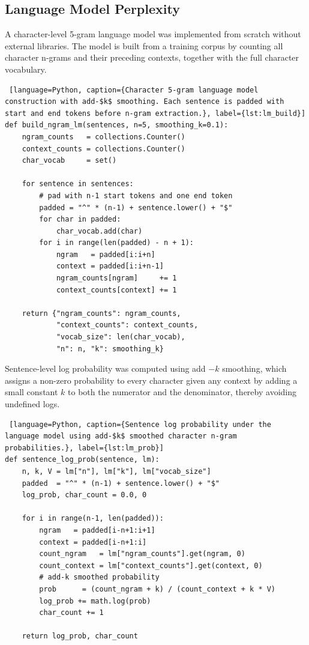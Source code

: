 \documentclass[12pt]{ThesisRU}
\begin{document}
\subsection{Language Model Perplexity}

A character-level 5-gram language model was implemented from scratch without external libraries. The model is built from a training corpus by counting all character n-grams and their preceding contexts, together with the full character vocabulary.

\begin{lstlisting} [language=Python, caption={Character 5-gram language model construction with add-$k$ smoothing. Each sentence is padded with start and end tokens before n-gram extraction.}, label={lst:lm_build}]
def build_ngram_lm(sentences, n=5, smoothing_k=0.1):
    ngram_counts   = collections.Counter()
    context_counts = collections.Counter()
    char_vocab     = set()
 
    for sentence in sentences:
        # pad with n-1 start tokens and one end token
        padded = "^" * (n-1) + sentence.lower() + "$"
        for char in padded:
            char_vocab.add(char)
        for i in range(len(padded) - n + 1):
            ngram   = padded[i:i+n]
            context = padded[i:i+n-1]
            ngram_counts[ngram]     += 1
            context_counts[context] += 1
 
    return {"ngram_counts": ngram_counts,
            "context_counts": context_counts,
            "vocab_size": len(char_vocab),
            "n": n, "k": smoothing_k}
\end{lstlisting}

Sentence-level log probability was computed using add $-k$ smoothing, which assigns a non-zero probability to every character given any context by adding a small constant $k$ to both the numerator and the denominator, thereby avoiding undefined logs.

\begin{lstlisting} [language=Python, caption={Sentence log probability under the language model using add-$k$ smoothed character n-gram probabilities.}, label={lst:lm_prob}]
def sentence_log_prob(sentence, lm):
    n, k, V = lm["n"], lm["k"], lm["vocab_size"]
    padded  = "^" * (n-1) + sentence.lower() + "$"
    log_prob, char_count = 0.0, 0
 
    for i in range(n-1, len(padded)):
        ngram   = padded[i-n+1:i+1]
        context = padded[i-n+1:i]
        count_ngram   = lm["ngram_counts"].get(ngram, 0)
        count_context = lm["context_counts"].get(context, 0)
        # add-k smoothed probability
        prob      = (count_ngram + k) / (count_context + k * V)
        log_prob += math.log(prob)
        char_count += 1
 
    return log_prob, char_count
\end{lstlisting}
\end{document}
